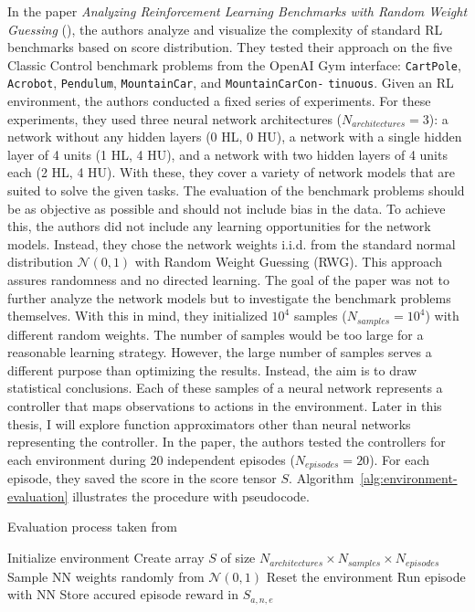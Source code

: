In the paper \emph{Analyzing Reinforcement Learning Benchmarks with Random Weight Guessing} (\cite{oller_analyzing_2020}), the authors analyze and visualize the complexity of standard RL benchmarks based on score distribution. They tested their approach on the five Classic Control benchmark problems from the OpenAI Gym interface: \verb|CartPole|, \verb|Acrobot|, \verb|Pendulum|, \verb|MountainCar|, and \verb|MountainCarCon-| \verb|tinuous|. Given an RL environment, the authors conducted a fixed series of experiments. For these experiments, they used three neural network architectures ($N_{architectures}=3$): a network without any hidden layers (0 HL, 0 HU), a network with a single hidden layer of 4 units (1 HL, 4 HU), and a network with two hidden layers of 4 units each (2 HL, 4 HU). With these, they cover a variety of network models that are suited to solve the given tasks. The evaluation of the benchmark problems should be as objective as possible and should not include bias in the data. To achieve this, the authors did not include any learning opportunities for the network models. Instead, they chose the network weights i.i.d. from the standard normal distribution $\mathcal{N}(0,1)$ with Random Weight Guessing (RWG). This approach assures randomness and no directed learning. The goal of the paper was not to further analyze the network models but to investigate the benchmark problems themselves. With this in mind, they initialized $10^4$ samples ($N_{samples}=10^4$) with different random weights. The number of samples would be too large for a reasonable learning strategy. However, the large number of samples serves a different purpose than optimizing the results. Instead, the aim is to draw statistical conclusions. Each of these samples of a neural network represents a controller that maps observations to actions in the environment. Later in this thesis, I will explore function approximators other than neural networks representing the controller. In the paper, the authors tested the controllers for each environment during 20 independent episodes ($N_{episodes}=20$). For each episode, they saved the score in the score tensor $S$. Algorithm~\ref{alg:environment-evaluation} illustrates the procedure with pseudocode.

\begin{algorithm}
\caption{Evaluation process taken from \cite{oller_analyzing_2020}}
\begin{algorithmic}[1]
\State Initialize environment
\State Create array $S$ of size $N_{architectures} \times N_{samples} \times N_{episodes}$
    \State Sample NN weights randomly from $\mathcal{N}(0,1)$
      \State Reset the environment
      \State Run episode with NN
      \State Store accured episode reward in $S_{a,n,e}$
    \EndFor
\EndFor
\end{algorithmic}
\label{alg:environment-evaluation}
\end{algorithm}

